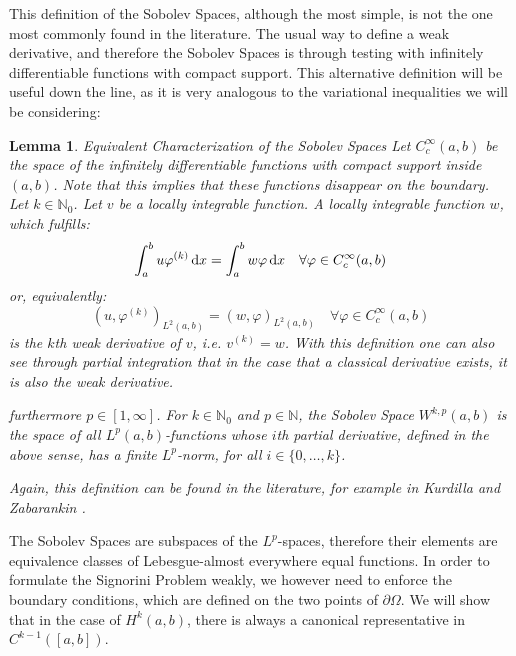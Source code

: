 \documentclass[headsepline,footsepline,footinclude=false,oneside,fontsize=11pt,paper=a4,listof=totoc,bibliography=totoc]{scrbook} %
\newtheorem{lemma}{Lemma}
\begin{document}
This definition of the Sobolev Spaces, although the most simple, is not the one most commonly found in the literature. The usual way to define a weak derivative, and therefore the Sobolev Spaces is through testing with infinitely differentiable functions with compact support. This alternative definition will be useful down the line, as it is very analogous to the variational inequalities we will be considering:

\begin{lemma} Equivalent Characterization of the Sobolev Spaces \newline
	Let $C_c^\infty(a,b)$ be the space of the infinitely differentiable functions with compact support inside $(a,b)$. Note that this implies that these functions disappear on the boundary. Let $k \in \mathbb{N}_0$. Let $v$ be a locally integrable function. A locally integrable function $w$, which fulfills:
	\begin{equation} \label{eq:weak_derivative_through_testing}
	\int_a^b u \varphi^{(k)} \dif x = \int_a^b w \varphi \dif x \quad \forall \varphi \in C_c^\infty(a,b)
	\end{equation}
	or, equivalently:
	\begin{equation}
		(u,\varphi^{(k)})_{L^2(a,b)} = (w,\varphi)_{L^2(a,b)} \quad \forall \varphi \in C_c^\infty(a,b)
	\end{equation}
	is the $k$th weak derivative of $v$, i.e. $v^{(k)} = w$. With this definition one can also see through partial integration that in the case that a classical derivative exists, it is also the weak derivative.
	
	 furthermore $p\in [1,\infty]$. For $k \in \mathbb{N}_0$ and $p \in \mathbb{N}$, the Sobolev Space $W^{k,p}(a,b)$ is the space of all $L^p(a,b)$-functions whose $i$th partial derivative, defined in the above sense, has a finite $L^p$-norm, for all $i \in \{0,\dots,k\}$. 
	
	
	Again, this definition can be found in the literature, for example in Kurdilla and Zabarankin \cite[Definition 3.2.3]{kurdila2005convex}.
\end{lemma}

The Sobolev Spaces are subspaces of the $L^p$-spaces, therefore their elements are equivalence classes of Lebesgue-almost everywhere equal functions. In order to formulate the Signorini Problem weakly, we however need to enforce the boundary conditions, which are defined on the two points of $\partial \Omega$. We will show that in the case of $H^k(a,b)$, there is always a canonical representative in $C^{k-1}([a,b])$.
\end{document}
